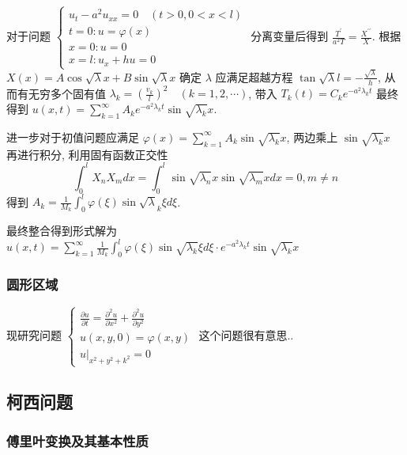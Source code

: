 \documentclass[10pt]{yerbaformat}
\begin{document}
\par 对于问题 $\left\{\begin{array}{l}u_{t}-a^{2} u_{x x}=0 \quad(t>0,0<x<l) \\ t=0: u=\varphi(x) \\ x=0: u=0 \\ x=l: u_{x}+h u=0\end{array}\right.$ 分离变量后得到 $\frac{T^{\prime}}{a^{2} T}=\frac{X^{\prime \prime}}{X}$. 根据 $X(x)=A \cos \sqrt{\lambda} x+B \sin \sqrt{\lambda} x$ 确定 $\lambda$ 应满足超越方程 $\tan \sqrt{\lambda} l=-\frac{\sqrt{\lambda}}{h}$, 从而有无穷多个固有值 $\lambda_{k}=\left(\frac{v_{k}}{l}\right)^{2} \quad(k=1,2, \cdots)$, 带入 $T_{k}(t)=C_{k} e^{-a^{2} \lambda_{k} t}$ 最终得到 $u(x, t)=\sum_{k=1}^{\infty} A_{k} e^{-a^{2} \lambda_{k} t} \sin \sqrt{\lambda_{k}} x$.

\par 进一步对于初值问题应满足 $\varphi(x)=\sum_{k=1}^{\infty} A_{k} \sin \sqrt{\lambda_{k}} x$, 两边乘上 $\sin \sqrt{\lambda_{k}} x$ 再进行积分, 利用固有函数正交性 $$\int_{0}^{l} X_{n} X_{m} d x=\int_{0}^{l} \sin \sqrt{\lambda_{n}} x \sin \sqrt{\lambda_{m}} x d x=0, m \neq n$$ 得到 $A_{k}=\frac{1}{M_{k}} \int_{0}^{l} \varphi(\xi) \sin \sqrt{\lambda}_{k} \xi d \xi$.

\par 最终整合得到形式解为 $u(x, t)=\sum_{k=1}^{\infty} \frac{1}{M_{k}} \int_{0}^{l} \varphi(\xi) \sin \sqrt{\lambda_{k}} \xi d \xi \cdot e^{-a^{2} \lambda_{k} t} \sin \sqrt{\lambda_{k}} x$

\subsubsection{圆形区域}
\par 现研究问题 $\left\{\begin{array}{l}\frac{\partial u}{\partial t}=\frac{\partial^{2} u}{\partial x^{2}}+\frac{\partial^{2} u}{\partial y^{2}} \\ u(x, y, 0)=\varphi(x, y) \\ \left.u\right|_{x^{2}+y^{2}+k^{2}}=0\end{array}\right.$ 这个问题很有意思..

\subsection{柯西问题}
\subsubsection{傅里叶变换及其基本性质}
\end{document}
